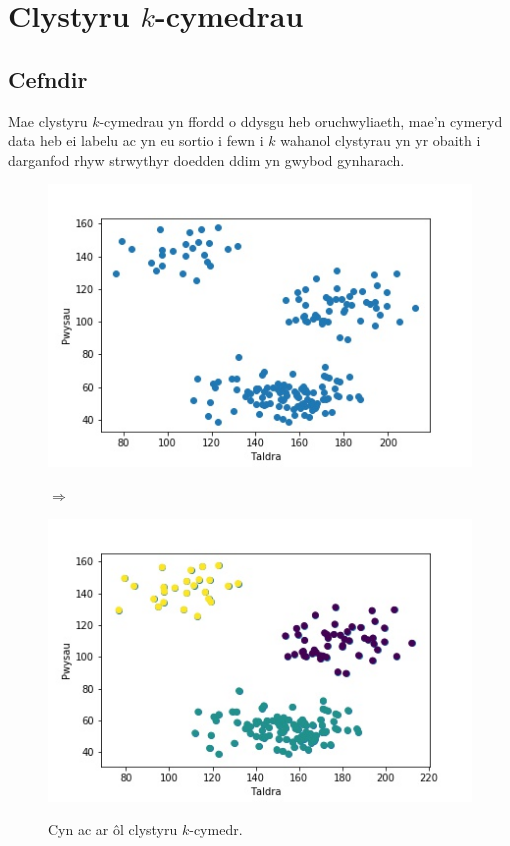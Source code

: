 \chapter{Clystyru $k$-cymedrau}\label{cha:literature}
\section{Cefndir}\label{sec:axelrodoriginal}
Mae clystyru $k$-cymedrau yn ffordd o ddysgu heb oruchwyliaeth, mae'n cymeryd data heb ei labelu ac yn eu sortio i fewn i $k$ wahanol clystyrau yn yr obaith i darganfod rhyw strwythyr doedden ddim yn gwybod gynharach.

\begin{figure}
\begin{center}
\begin{minipage}{.4\linewidth}
\includegraphics[width=1\linewidth]{../img/Scatterpython.jpeg}
\end{minipage}%
\begin{minipage}{1cm}
$\Rightarrow$
\end{minipage}%
\begin{minipage}{.4\linewidth}
\includegraphics[width=1\linewidth]{../img/3clystwrpython.jpeg}
\end{minipage}%
\label{fig:Cefndir_Clysteru_k_modd}
\caption{Cyn ac ar \^{o}l clystyru $k$-cymedr.}
\end{center}
\end{figure}

